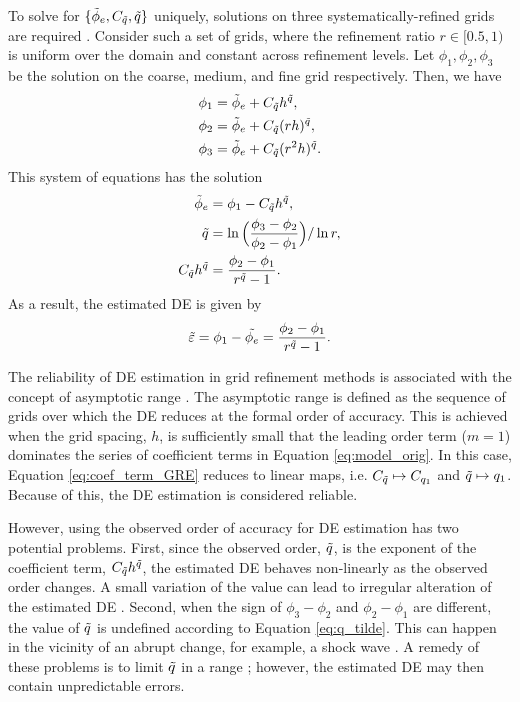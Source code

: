 To solve for $\{\Tilde{\phi}_{e}, C_{\Tilde{q}}, {\Tilde{q}}\}$ uniquely, solutions on three systematically-refined grids are required \citep{Roy2010}. Consider such a set of grids, where the refinement ratio $r \in [0.5,1)$ is uniform over the domain and constant across refinement levels. Let $\phi_1, \phi_2, \phi_3$ be the solution on the coarse, medium, and fine grid respectively. Then, we have
\begin{align}
    \phi_1 &= \Tilde{\phi}_{e} + C_{\Tilde{q}} h^{\Tilde{q}}, \\
    \phi_2 &= \Tilde{\phi}_{e} + C_{\Tilde{q}} (r h)^{\Tilde{q}}, \\
    \phi_3 &= \Tilde{\phi}_{e} + C_{\Tilde{q}} (r^2 h)^{\Tilde{q}}.
\end{align}
This system of equations has the solution
\begin{align}
    \Tilde{\phi}_{e} &= \phi_1 - C_{\Tilde{q}} h^{\Tilde{q}}, \\
    \Tilde{q} &= \ln \Big( \frac{\phi_3 - \phi_2}{\phi_2 - \phi_1} \Big) / \ln r, \label{eq:q_tilde} \\
    C_{\Tilde{q}} h^{\Tilde{q}} &= \frac{\phi_2 - \phi_1}{r^{\Tilde{q}} - 1}.
\end{align}
As a result, the estimated DE is given by
\begin{equation}
    \Tilde{\varepsilon} = \phi_1 - \Tilde{\phi_{e}} = \frac{\phi_2 - \phi_1}{r^{\Tilde{q}} - 1}.
\end{equation}

The reliability of DE estimation in grid refinement methods is associated with the concept of asymptotic range \citep{Roy2010}. The asymptotic range is defined as the sequence of grids over which the DE reduces at the formal order of accuracy. This is achieved when the grid spacing, $h$, is sufficiently small that the leading order term ($m=1$) dominates the series of coefficient terms in Equation \ref{eq:model_orig}. In this case, Equation \ref{eq:coef_term_GRE} reduces to linear maps, i.e. $C_{\Tilde{q}} \mapsto C_{q_1}$ and $\Tilde{q} \mapsto q_1$. Because of this, the DE estimation is considered reliable.

However, using the observed order of accuracy for DE estimation has two potential problems. First, since the observed order, $\Tilde{q}$, is the exponent of the coefficient term, $C_{\Tilde{q}} h^{\Tilde{q}}$, the estimated DE behaves non-linearly as the observed order changes. A small variation of the value can lead to irregular alteration of the estimated DE \citep{Roy2003,Eca2009,Hodis2012GridAneurysms}. Second, when the sign of $\phi_3 - \phi_2$ and $\phi_2 - \phi_1$ are different, the value of $\Tilde{q}$ is undefined according to Equation \ref{eq:q_tilde}. This can happen in the vicinity of an abrupt change, for example, a shock wave \citep{Roy2003}. A remedy of these problems is to limit $\Tilde{q}$ in a range \citep{OberkampfRoy2010}; however, the estimated DE may then contain unpredictable errors.

